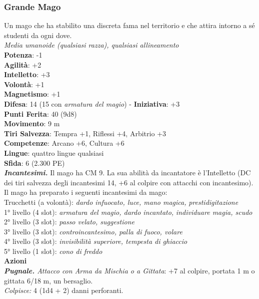 \begin{multicols}{2}
\subsubsection{Grande Mago}
Un mago che ha stabilito una discreta fama nel territorio e che attira intorno a sé studenti da ogni dove.\\
\emph{Media umanoide (qualsiasi razza), qualsiasi allineamento}\\
\textbf{Potenza}: -1\\
\textbf{Agilità}: +2\\
\textbf{Intelletto}: +3\\
\textbf{Volontà}: +1\\
\textbf{Magnetismo}: +1\\
\textbf{Difesa}: 14 (15 con \emph{armatura del magio}) - \textbf{Iniziativa}: +3\\
\textbf{Punti Ferita}: 40 (9d8)\\
\textbf{Movimento}: 9 m\\
\textbf{Tiri Salvezza}: Tempra +1, Riflessi +4, Arbitrio +3 \\
\textbf{Competenze}: Arcano +6, Cultura +6\\
\textbf{Lingue}: quattro lingue qualsiasi\\
\textbf{Sfida}: 6 (2.300 PE)\smallskip\\
\emph{\textbf{Incantesimi.}} Il mago ha CM 9. La sua abilità da incantatore è l'Intelletto (DC dei tiri salvezza degli incantesimi 14, +6 al colpire con attacchi con incantesimo). Il mago ha preparato i seguenti incantesimi da mago:\\
Trucchetti (a volontà): \emph{dardo infuocato, luce, mano magica,} \emph{prestidigitazione}\\
1° livello (4 slot): \emph{armatura del magio, dardo incantato,} \emph{individuare magia, scudo}\\
2° livello (3 slot): \emph{passo velato, suggestione}\\
3° livello (3 slot): \emph{controincantesimo, palla di fuoco, volare}\\
4° livello (3 slot): \emph{invisibilità superiore, tempesta di ghiaccio}\\
5° livello (1 slot): \emph{cono di freddo}\\
\smallskip\textbf{Azioni}\\
\emph{\textbf{Pugnale.} Attacco con Arma da Mischia o a Gittata}: +7 al colpire, portata 1 m o gittata 6/18 m, un bersaglio.\\
\emph{Colpisce:} 4 (1d4 + 2) danni perforanti.


\end{multicols}

